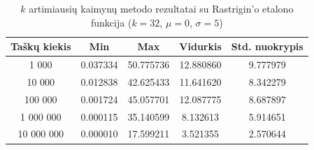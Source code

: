 \begin{table}[H]
    \centering
    \begin{tabular}{|c|c|c|c|c|}
        \hline
        \textbf{Taškų kiekis} & \textbf{Min} & \textbf{Max} & \textbf{Vidurkis} & \textbf{Std. nuokrypis} \\ \hline
        1 000        & 0.037334 & 50.775736 & 12.880860 & 9.777979 \\ \hline
        10 000       & 0.012838 & 42.625433 & 11.641620 & 8.342279 \\ \hline
        100 000      & 0.001724 & 45.057701 & 12.087775 & 8.687897 \\ \hline
        1 000 000    & 0.000115 & 35.140599 & 8.132613 & 5.914651 \\ \hline
        10 000 000   & 0.000010 & 17.599211 & 3.521355 & 2.570644 \\ \hline
    \end{tabular}
    \caption{$k$ artimiausių kaimynų metodo rezultatai su Rastrigin'o etalono funkcija ($k = 32$, $\mu = 0$, $\sigma = 5$)}
\end{table}